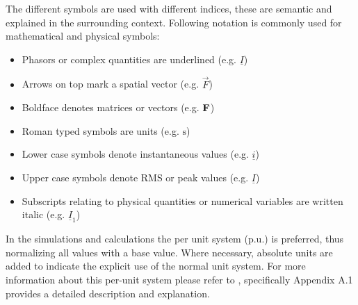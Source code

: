 The different symbols are used with different indices, these are semantic and explained in the surrounding context.
Following notation is commonly used for mathematical and physical symbols:
\begin{itemize}[noitemsep]
    \item Phasors or complex quantities are underlined (e.g. $\underline{I}$)
    \item Arrows on top mark a spatial vector (e.g. $\overrightarrow{F}$)
    \item Boldface denotes matrices or vectors (e.g. $\mathrm{\textbf{F}}$)
    \item Roman typed symbols are units (e.g. $\mathrm{s}$)
    \item Lower case symbols denote instantaneous values (e.g. $\underline{i}$)
    \item Upper case symbols denote \acs{RMS} or peak values (e.g. $\underline{I}$)
    \item Subscripts relating to physical quantities or numerical variables are written italic (e.g. $\underline{I}_1$) 
\end{itemize}

In the simulations and calculations the per unit system ($\mathrm{p.u.}$) is preferred, thus normalizing all values with a base value. 
Where necessary, absolute units are added to indicate the explicit use of the normal unit system. 
For more information about this per-unit system please refer to \textcite{machowski_2020}, specifically Appendix A.1 provides a detailed description and explanation.